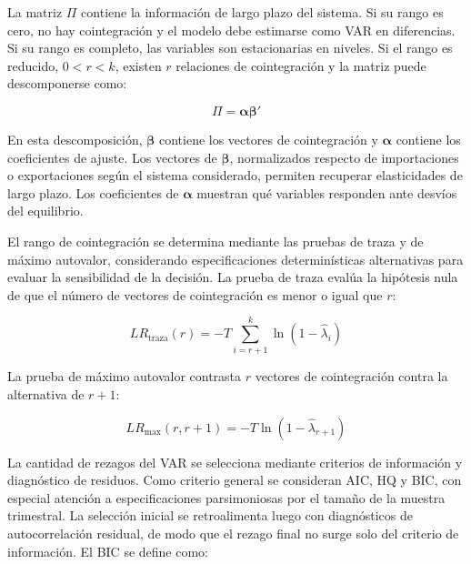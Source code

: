 \documentclass[11pt,a4paper]{article}
\begin{document}
	La matriz \(\Pi\) contiene la información de largo plazo del sistema. Si su
	rango es cero, no hay cointegración y el modelo debe estimarse como VAR en
	diferencias. Si su rango es completo, las variables son estacionarias en
	niveles. Si el rango es reducido, \(0 < r < k\), existen \(r\) relaciones de
	cointegración y la matriz puede descomponerse como:
	
	\begin{equation}
		\Pi = \boldsymbol{\alpha}\boldsymbol{\beta}'
		\label{eq:tp3-pi-alpha-beta}
	\end{equation}
	
	En esta descomposición, \(\boldsymbol{\beta}\) contiene los vectores de
	cointegración y \(\boldsymbol{\alpha}\) contiene los coeficientes de ajuste. Los
	vectores de \(\boldsymbol{\beta}\), normalizados respecto de importaciones o
	exportaciones según el sistema considerado, permiten recuperar elasticidades de
	largo plazo. Los coeficientes de \(\boldsymbol{\alpha}\) muestran qué variables
	responden ante desvíos del equilibrio.
	
	El rango de cointegración se determina mediante las pruebas de traza y de máximo
	autovalor, considerando especificaciones determinísticas alternativas para
	evaluar la sensibilidad de la decisión. La prueba de traza evalúa la hipótesis
	nula de que el número de vectores de cointegración es menor o igual que \(r\):
	
	\begin{equation}
		LR_{\text{traza}}(r)
		= -T \sum_{i=r+1}^{k}\ln(1-\widehat{\lambda}_i)
		\label{eq:tp3-johansen-traza}
	\end{equation}
	
	La prueba de máximo autovalor contrasta \(r\) vectores de cointegración contra
	la alternativa de \(r+1\):
	
	\begin{equation}
		LR_{\text{max}}(r,r+1)
		= -T \ln(1-\widehat{\lambda}_{r+1})
		\label{eq:tp3-johansen-max}
	\end{equation}
	
	La cantidad de rezagos del VAR se selecciona mediante criterios de información
	y diagnóstico de residuos. Como criterio general se consideran AIC, HQ y BIC,
	con especial atención a especificaciones parsimoniosas por el tamaño de la
	muestra trimestral. La selección inicial se retroalimenta luego con
	diagnósticos de autocorrelación residual, de modo que el rezago final no surge
	solo del criterio de información. El BIC se define como:
	
\end{document}
